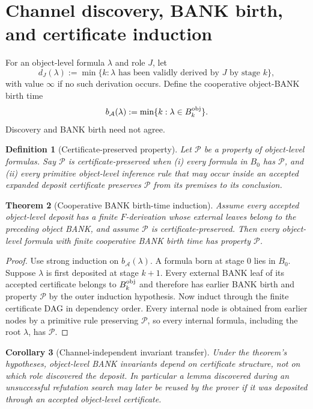 \documentclass[11pt]{article}
\newtheorem{definition}{Definition}[section]
\newtheorem{theorem}[definition]{Theorem}
\newtheorem{corollary}[definition]{Corollary}
\theoremstyle{remark}
\begin{document}
\section{Channel discovery, BANK birth, and certificate induction}
For an object-level formula $\lambda$ and role $J$, let
\[
d_J(\lambda):=\min\{k:\lambda\text{ has been validly derived by }J\text{ by stage }k\},
\]
with value $\infty$ if no such derivation occurs. Define the cooperative object-BANK birth time
\[
b_{\mathcal A}(\lambda):=\min\{k:\lambda\in B_k^{\rm obj}\}.
\]
Discovery and BANK birth need not agree.

\begin{definition}[Certificate-preserved property]
Let $\mathcal P$ be a property of object-level formulas. Say $\mathcal P$ is certificate-preserved when (i) every formula in $B_0$ has $\mathcal P$, and (ii) every primitive object-level inference rule that may occur inside an accepted expanded deposit certificate preserves $\mathcal P$ from its premises to its conclusion.
\end{definition}

\begin{theorem}[Cooperative BANK birth-time induction]
Assume every accepted object-level deposit has a finite $F$-derivation whose external leaves belong to the preceding object BANK, and assume $\mathcal P$ is certificate-preserved. Then every object-level formula with finite cooperative BANK birth time has property $\mathcal P$.
\end{theorem}
\begin{proof}
Use strong induction on $b_{\mathcal A}(\lambda)$. A formula born at stage $0$ lies in $B_0$. Suppose $\lambda$ is first deposited at stage $k+1$. Every external BANK leaf of its accepted certificate belongs to $B_k^{\rm obj}$ and therefore has earlier BANK birth and property $\mathcal P$ by the outer induction hypothesis. Now induct through the finite certificate DAG in dependency order. Every internal node is obtained from earlier nodes by a primitive rule preserving $\mathcal P$, so every internal formula, including the root $\lambda$, has $\mathcal P$.
\end{proof}

\begin{corollary}[Channel-independent invariant transfer]
Under the theorem's hypotheses, object-level BANK invariants depend on certificate structure, not on which role discovered the deposit. In particular a lemma discovered during an unsuccessful refutation search may later be reused by the prover if it was deposited through an accepted object-level certificate.
\end{corollary}
\end{document}
